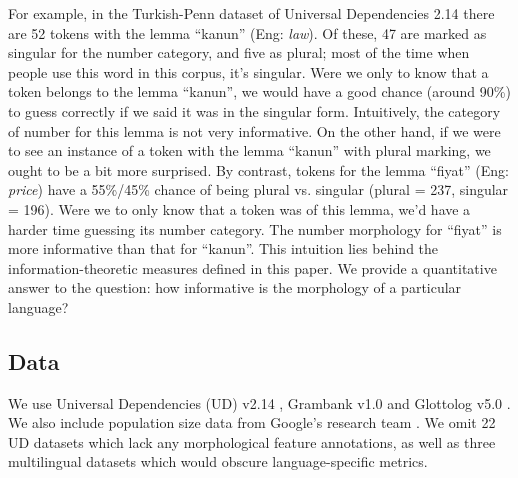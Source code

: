 \documentclass[USenglish]{article}
\begin{document}
For example, in the Turkish-Penn dataset of Universal Dependencies 2.14 there are 52 tokens with the lemma ``kanun'' (Eng: \textit{law}).
Of these, 47 are marked as singular for the number category, and five as plural; most of the time when people use this word in this corpus, it's singular.
Were we only to know that a token belongs to the lemma ``kanun'', we would have a good chance (around 90\%) to guess correctly if we said it was in the singular form.
Intuitively, the category of number for this lemma is not very informative.
On the other hand, if we were to see an instance of a token with the lemma ``kanun'' with plural marking, we ought to be a bit more surprised.
By contrast, tokens for the lemma ``fiyat'' (Eng: \textit{price}) have a 55\%/45\% chance of being plural vs. singular (plural = 237, singular = 196). 
Were we to only know that a token was of this lemma, we'd have a harder time guessing its number category. 
The number morphology for ``fiyat'' is more informative than that for ``kanun''.
This intuition lies behind the information-theoretic measures defined in this paper.
We provide a quantitative answer to the question: how informative is the morphology of a particular language?

\subsection{Data}
We use Universal Dependencies (UD) v2.14 \citep{UD_2.14}, Grambank v1.0 \citep{grambank_release, grambank_dataset_zenodo_v1} and Glottolog v5.0 \citep{glottolog5.0}.
We also include population size data from Google's research team \citep{ritchie-etal-2024-linguameta-unified}.
We omit 22 UD datasets which lack any morphological feature annotations, as well as three multilingual datasets which would obscure language-specific metrics.
\end{document}
